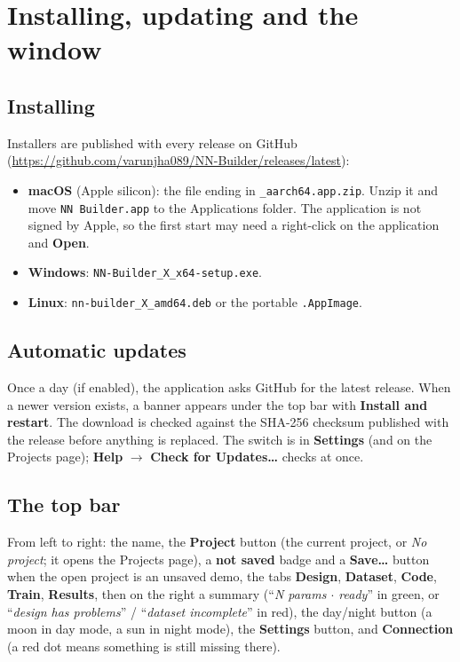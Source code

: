 \documentclass[11pt,a4paper]{article}
\newcommand{\ui}[1]{\textbf{\textsf{#1}}}
\newcommand{\file}[1]{\texttt{#1}}
\begin{document}
\section{Installing, updating and the window}

\subsection{Installing}
Installers are published with every release on GitHub (\url{https://github.com/varunjha089/NN-Builder/releases/latest}):
\begin{itemize}
  \item \textbf{macOS} (Apple silicon): the file ending in \file{\_aarch64.app.zip}. Unzip it and move \file{NN Builder.app} to
        the Applications folder. The application is not signed by Apple, so the first start may need a right-click on the application and
        \ui{Open}.
  \item \textbf{Windows}: \file{NN-Builder\_X\_x64-setup.exe}.
  \item \textbf{Linux}: \file{nn-builder\_X\_amd64.deb} or the portable \file{.AppImage}.
\end{itemize}

\subsection{Automatic updates}
Once a day (if enabled), the application asks GitHub for the latest release. When a newer version exists, a banner appears under the top
bar with \ui{Install and restart}. The download is checked against the SHA-256 checksum published with the release before anything is
replaced. The switch is in \ui{Settings} (and on the Projects page); \ui{Help} $\rightarrow$ \ui{Check for Updates\ldots} checks at once.

\subsection{The top bar}
From left to right: the name, the \ui{Project} button (the current project, or \emph{No project}; it opens the Projects page), a
\ui{not saved} badge and a \ui{Save\ldots} button when the open project is an unsaved demo, the tabs \ui{Design}, \ui{Dataset},
\ui{Code}, \ui{Train}, \ui{Results}, then on the right a summary (``\emph{N params $\cdot$ ready}'' in green, or
``\emph{design has problems}'' / ``\emph{dataset incomplete}'' in red), the day/night button (a moon in day mode, a sun in night mode), the \ui{Settings} button, and \ui{Connection} (a red dot means something is still missing there).
\end{document}
